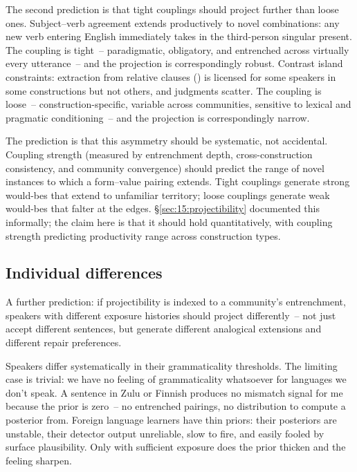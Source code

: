 The second prediction is that tight couplings should project further than loose ones. Subject--verb agreement extends productively to novel combinations: any new verb entering English immediately takes  in the third-person singular present. The coupling is tight~-- paradigmatic, obligatory, and entrenched across virtually every utterance~-- and the projection is correspondingly robust. Contrast island constraints: extraction from relative clauses (\marg{}) is licensed for some speakers in some constructions but not others, and judgments scatter. The coupling is loose~-- construction-specific, variable across communities, sensitive to lexical and pragmatic conditioning~-- and the projection is correspondingly narrow.

The prediction is that this asymmetry should be systematic, not accidental. Coupling strength (measured by entrenchment depth, cross-construction consistency, and community convergence) should predict the range of novel instances to which a form--value pairing extends. Tight couplings generate strong would-bes that extend to unfamiliar territory; loose couplings generate weak would-bes that falter at the edges. §\ref{sec:15:projectibility} documented this informally; the claim here is that it should hold quantitatively, with coupling strength predicting productivity range across construction types.

\subsection{Individual differences}
\label{sec:15:individual-differences}

A further prediction: if projectibility is indexed to a community's entrenchment, speakers with different exposure histories should project differently~-- not just accept different sentences, but generate different analogical extensions and different repair preferences.

Speakers differ systematically in their grammaticality thresholds. The limiting case is trivial: we have no feeling of grammaticality whatsoever for languages we don't speak. A sentence in Zulu or Finnish produces no mismatch signal for me because the prior is zero~-- no entrenched pairings, no distribution to compute a posterior from. Foreign language learners have thin priors: their posteriors are unstable, their detector output unreliable, slow to fire, and easily fooled by surface plausibility. Only with sufficient exposure does the prior thicken and the feeling sharpen.

